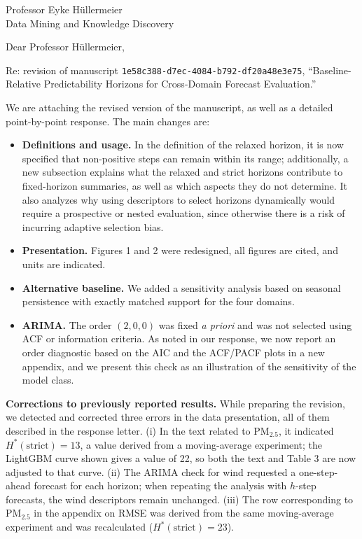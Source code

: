 \documentclass[10pt,a4paper]{letter}
\date{2 October 2026}
\begin{document}
\begin{letter}{Professor Eyke H\"ullermeier\\Data Mining and Knowledge Discovery}
\opening{Dear Professor H\"ullermeier,}

Re: revision of manuscript \nolinkurl{1e58c388-d7ec-4084-b792-df20a48e3e75},
``Baseline-Relative Predictability Horizons for Cross-Domain Forecast Evaluation.''

We are attaching the revised version of the manuscript, as well as a detailed point-by-point response. The main changes are:

\begin{itemize}[leftmargin=*,itemsep=0pt]
\item \textbf{Definitions and usage.} In the definition of the relaxed horizon, it is now specified that non-positive steps can remain within its range; additionally, a new subsection explains what the relaxed and strict horizons contribute to fixed-horizon summaries, as well as which aspects they do not determine. It also analyzes why using descriptors to select horizons dynamically would require a prospective or nested evaluation, since otherwise there is a risk of incurring adaptive selection bias.
\item \textbf{Presentation.} Figures 1 and 2 were redesigned, all figures are cited, and units are indicated.
\item \textbf{Alternative baseline.} We added a sensitivity analysis based on seasonal persistence with exactly matched support for the four domains.
\item \textbf{ARIMA.} The order $(2,0,0)$ was fixed \emph{a priori} and was not selected using ACF or information criteria. As noted in our response, we now report an order diagnostic based on the AIC and the ACF/PACF plots in a new appendix, and we present this check as an illustration of the sensitivity of the model class.
\end{itemize}

\textbf{Corrections to previously reported results.} While preparing the revision, we detected and corrected three errors in the data presentation, all of them described in the response letter. (i) In the text related to PM$_{2.5}$, it indicated $H^*(\mathrm{strict})=13$, a value derived from a moving-average experiment; the LightGBM curve shown gives a value of 22, so both the text and Table 3 are now adjusted to that curve. (ii) The ARIMA check for wind requested a one-step-ahead forecast for each horizon; when repeating the analysis with $h$-step forecasts, the wind descriptors remain unchanged. (iii) The row corresponding to PM$_{2.5}$ in the appendix on RMSE was derived from the same moving-average experiment and was recalculated ($H^*(\mathrm{strict})=23$).


\end{letter}
\end{document}

